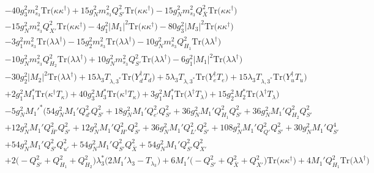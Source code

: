 {\begin{align}
 &-40 g_{3}^{2} m_{s_3}^2 \mbox{Tr}\Big({\kappa  \kappa^{\dagger}}\Big) +15 g_{N}^{2} m_{s_3}^2 Q_{S'}^{2} \mbox{Tr}\Big({\kappa  \kappa^{\dagger}}\Big) -15 g_{N}^{2} m_{s_3}^2 Q_{\bar{X}}^{2} \mbox{Tr}\Big({\kappa  \kappa^{\dagger}}\Big) \nonumber \\ 
 &-15 g_{N}^{2} m_{s_3}^2 Q_{X'}^{2} \mbox{Tr}\Big({\kappa  \kappa^{\dagger}}\Big) -4 g_{1}^{2} |M_1|^2 \mbox{Tr}\Big({\kappa  \kappa^{\dagger}}\Big) -80 g_{3}^{2} |M_3|^2 \mbox{Tr}\Big({\kappa  \kappa^{\dagger}}\Big) \nonumber \\ 
 &-3 g_{1}^{2} m_{s_3}^2 \mbox{Tr}\Big({\lambda  \lambda^{\dagger}}\Big) -15 g_{2}^{2} m_{s_3}^2 \mbox{Tr}\Big({\lambda  \lambda^{\dagger}}\Big) -10 g_{N}^{2} m_{s_3}^2 Q_{H_1}^{2} \mbox{Tr}\Big({\lambda  \lambda^{\dagger}}\Big) \nonumber \\ 
 &-10 g_{N}^{2} m_{s_3}^2 Q_{H_2}^{2} \mbox{Tr}\Big({\lambda  \lambda^{\dagger}}\Big) +10 g_{N}^{2} m_{s_3}^2 Q_{S'}^{2} \mbox{Tr}\Big({\lambda  \lambda^{\dagger}}\Big) -6 g_{1}^{2} |M_1|^2 \mbox{Tr}\Big({\lambda  \lambda^{\dagger}}\Big) \nonumber \\ 
 &-30 g_{2}^{2} |M_2|^2 \mbox{Tr}\Big({\lambda  \lambda^{\dagger}}\Big) +15 \lambda_3 T_{{\lambda,3}^*} \mbox{Tr}\Big({Y_{d}^{\dagger}  T_d}\Big) +5 \lambda_3 T_{{\lambda,3}^*} \mbox{Tr}\Big({Y_{e}^{\dagger}  T_e}\Big) +15 \lambda_3 T_{{\lambda,3}^*} \mbox{Tr}\Big({Y_{u}^{\dagger}  T_u}\Big) \nonumber \\ 
 &+2 g_{1}^{2} M_1^* \mbox{Tr}\Big({\kappa^{\dagger}  T_{\kappa}}\Big) +40 g_{3}^{2} M_3^* \mbox{Tr}\Big({\kappa^{\dagger}  T_{\kappa}}\Big) +3 g_{1}^{2} M_1^* \mbox{Tr}\Big({\lambda^{\dagger}  T_{\lambda}}\Big) +15 g_{2}^{2} M_2^* \mbox{Tr}\Big({\lambda^{\dagger}  T_{\lambda}}\Big) \nonumber \\ 
 &-5 g_{N}^{2} M_1'^* \Big(54 g_{N}^{2} M_1' Q_{d'}^{2} Q_{S'}^{2} +18 g_{N}^{2} M_1' Q_{e'}^{2} Q_{S'}^{2} +36 g_{N}^{2} M_1' Q_{H_1}^{2} Q_{S'}^{2} +36 g_{N}^{2} M_1' Q_{H_2}^{2} Q_{S'}^{2} \nonumber \\ 
 &+12 g_{N}^{2} M_1' Q_{\bar{H}'}^{2} Q_{S'}^{2} +12 g_{N}^{2} M_1' Q_{H'}^{2} Q_{S'}^{2} +36 g_{N}^{2} M_1' Q_{L'}^{2} Q_{S'}^{2} +108 g_{N}^{2} M_1' Q_{Q'}^{2} Q_{S'}^{2} +30 g_{N}^{2} M_1' Q_{S'}^{4} \nonumber \\ 
 &+54 g_{N}^{2} M_1' Q_{S'}^{2} Q_{u'}^{2} +54 g_{N}^{2} M_1' Q_{S'}^{2} Q_{\bar{X}}^{2} +54 g_{N}^{2} M_1' Q_{S'}^{2} Q_{X'}^{2} \nonumber \\ 
 &+2 \Big(- Q_{S'}^{2}  + Q_{H_1}^{2} + Q_{H_2}^{2}\Big)\lambda_3^* \Big(2 M_1' \lambda_3  - T_{\lambda_3} \Big)+6 M_1' \Big(- Q_{S'}^{2}  + Q_{\bar{X}}^{2} + Q_{X'}^{2}\Big)\mbox{Tr}\Big({\kappa  \kappa^{\dagger}}\Big) +4 M_1' Q_{H_1}^{2} \mbox{Tr}\Big({\lambda  \lambda^{\dagger}}\Big) \nonumber \\ 

\end{align}}
